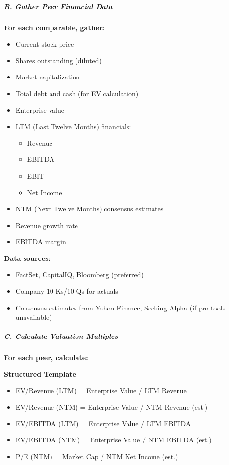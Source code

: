 \documentclass[11pt]{article}
\begin{document}
\subparagraph{B. Gather Peer Financial Data}\mbox{}\par

\textbf{For each comparable, gather:}

\begin{itemize}[leftmargin=*,itemsep=2pt,topsep=2pt]
\item {} Current stock price
\item {} Shares outstanding (diluted)
\item {} Market capitalization
\item {} Total debt and cash (for EV calculation)
\item {} Enterprise value
\item {} LTM (Last Twelve Months) financials:
\begin{itemize}[leftmargin=*,itemsep=2pt,topsep=2pt]
\item {} Revenue
\item {} EBITDA
\item {} EBIT
\item {} Net Income
\end{itemize}
\item {} NTM (Next Twelve Months) consensus estimates
\item {} Revenue growth rate
\item {} EBITDA margin
\end{itemize}

\textbf{Data sources:}

\begin{itemize}[leftmargin=*,itemsep=2pt,topsep=2pt]
\item {} FactSet, CapitalIQ, Bloomberg (preferred)
\item {} Company 10-Ks/10-Qs for actuals
\item {} Consensus estimates from Yahoo Finance, Seeking Alpha (if pro tools unavailable)
\end{itemize}

\subparagraph{C. Calculate Valuation Multiples}\mbox{}\par

\textbf{For each peer, calculate:}

\textbf{Structured Template}
\begin{itemize}[leftmargin=*,itemsep=2pt,topsep=2pt]
\item {} EV/Revenue (LTM) = Enterprise Value / LTM Revenue
\item {} EV/Revenue (NTM) = Enterprise Value / NTM Revenue (est.)
\item {} EV/EBITDA (LTM) = Enterprise Value / LTM EBITDA
\item {} EV/EBITDA (NTM) = Enterprise Value / NTM EBITDA (est.)
\item {} P/E (NTM) = Market Cap / NTM Net Income (est.)
\end{itemize}
\end{document}
